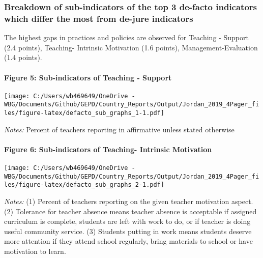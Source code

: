 \documentclass[twocolumn]{article}
\let\oldparagraph\paragraph
\renewcommand{\paragraph}[1]{\oldparagraph{#1}\mbox{}}
\begin{document}
\hypertarget{breakdown-of-sub-indicators-of-the-top-3-de-facto-indicators-which-differ-the-most-from-de-jure-indicators}{%
\subsubsection{\texorpdfstring{\textbf{Breakdown of sub-indicators of
the top 3 de-facto indicators which differ the most from de-jure
indicators}}{Breakdown of sub-indicators of the top 3 de-facto indicators which differ the most from de-jure indicators}}\label{breakdown-of-sub-indicators-of-the-top-3-de-facto-indicators-which-differ-the-most-from-de-jure-indicators}}

The highest gaps in practices and policies are observed for Teaching -
Support (2.4 points), Teaching- Intrinsic Motivation (1.6 points),
Management-Evaluation (1.4 points). \vfill\null

\hypertarget{figure-5-sub-indicators-of-teaching---support}{%
\paragraph{Figure 5: Sub-indicators of Teaching -
Support}\label{figure-5-sub-indicators-of-teaching---support}}

\texttt{[image: C:/Users/wb469649/OneDrive - WBG/Documents/Github/GEPD/Country\_Reports/Output/Jordan\_2019\_4Pager\_files/figure-latex/defacto\_sub\_graphs\_1-1.pdf]}

\color{darkgray}\scriptsize{\textit{Notes:} Percent of teachers reporting in affirmative unless stated otherwise}

\hypertarget{figure-6-sub-indicators-of-teaching--intrinsic-motivation}{%
\paragraph{Figure 6: Sub-indicators of Teaching- Intrinsic
Motivation}\label{figure-6-sub-indicators-of-teaching--intrinsic-motivation}}

\texttt{[image: C:/Users/wb469649/OneDrive - WBG/Documents/Github/GEPD/Country\_Reports/Output/Jordan\_2019\_4Pager\_files/figure-latex/defacto\_sub\_graphs\_2-1.pdf]}

\color{darkgray}\scriptsize{\textit{Notes:} (1) Percent of teachers reporting on the given teacher motivation aspect. (2) Tolerance for teacher absence means teacher absence is acceptable if assigned curriculum is complete, students are left with work to do, or if teacher is doing useful community service. (3) Students putting in work means students deserve more attention if they attend school regularly, bring materials to school or have motivation to learn.}
\end{document}

